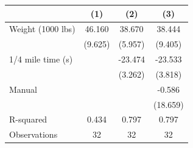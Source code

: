 \begin{tabular}{l*{3}{c}}
\doublerule
                &\multicolumn{1}{c}{(1)}&\multicolumn{1}{c}{(2)}&\multicolumn{1}{c}{(3)}\\
\midrule
Weight (1000 lbs)&46.160\sym{***}&38.670\sym{***}&38.444\sym{***}\\
                &  (9.625)&  (5.957)&  (9.405)\\
1/4 mile time (s)&         &-23.474\sym{***}&-23.533\sym{***}\\
                &         &  (3.262)&  (3.818)\\
Manual          &         &         &   -0.586\\
                &         &         & (18.659)\\
\midrule
R-squared       &    0.434&    0.797&    0.797\\
Observations    &       32&       32&       32\\
\midrule
\end{tabular}
